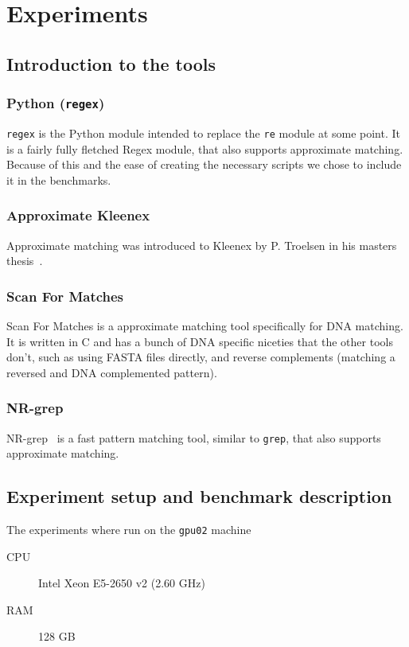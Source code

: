 \section{Experiments}

\subsection{Introduction to the tools}
\subsubsection{Python (\texttt{regex})}
\texttt{regex} is the Python module intended to replace the \texttt{re} module
at some point. It is a fairly fully fletched Regex module, that also supports
approximate matching. Because of this and the ease of creating the necessary
scripts we chose to include it in the benchmarks.

\subsubsection{Approximate Kleenex}
Approximate matching was introduced to Kleenex by P. Troelsen in his masters
thesis~\cite{troelsen2016approximate}.

\subsubsection{Scan For Matches}
Scan For Matches is a approximate matching tool specifically for DNA matching.
It is written in C and has a bunch of DNA specific niceties that the other
tools don't, such as using FASTA files directly, and reverse complements
(matching a reversed and DNA complemented pattern).

\subsubsection{NR-grep}
NR-grep~\cite{navarro2001nr} is a fast pattern matching tool, similar to
\texttt{grep}, that also supports approximate matching.


\subsection{Experiment setup and benchmark description}
The experiments where run on the \texttt{gpu02} machine
\begin{description}
    \item[CPU] Intel Xeon E5-2650 v2 (2.60 GHz)
    \item[RAM] 128 GB
\end{description}

